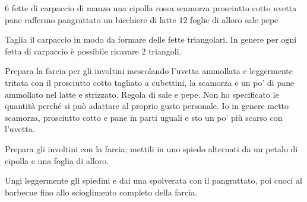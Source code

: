 \begin{ingreds}
	6 fette di carpaccio di manzo  
	una cipolla rossa 
	scamorza 
	prosciutto cotto  
	uvetta 
	pane raffermo 
	pangrattato 
	un bicchiere di latte 
	12 foglie di alloro 
	sale
	pepe
\end{ingreds}

\begin{method}
Taglia il carpaccio in modo da formare delle fette triangolari. In genere per ogni fetta di carpaccio è possibile ricavare 2 triangoli.

Prepara la farcia per gli involtini mescolando l'uvetta ammollata e leggermente tritata con il prosciutto cotto tagliato a cubettini, la scamorza e un po' di pane ammollato nel latte e strizzato. Regola di sale e pepe. Non ho specificato le quantità perché si può adattare al proprio gusto personale. Io in genere metto scamorza, prosciutto cotto e pane in parti uguali e sto un po' più scarso con l'uvetta.

Prepara gli involtini con la farcia; mettili in uno spiedo alternati da un petalo di cipolla e una foglia di alloro.

Ungi leggermente gli  spiedini e dai una spolverata con il pangrattato, poi cuoci al barbecue fino allo scioglimento completo della farcia.

\end {method}


